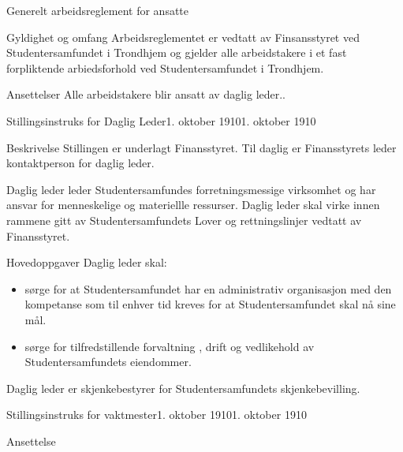 


\begin{lovkapittel}{Generelt arbeidsreglement for ansatte}


    \begin{lovparagraf}{Gyldighet og omfang}
        Arbeidsreglementet er vedtatt av Finsansstyret ved Studentersamfundet i Trondhjem
        og gjelder alle arbeidstakere i et fast forpliktende arbiedsforhold ved
        Studentersamfundet i Trondhjem. 
    \end{lovparagraf}

    \begin{lovparagraf}{Ansettelser}
        Alle arbeidstakere blir ansatt av daglig leder..
    \end{lovparagraf}


\end{lovkapittel}


\begin{instruks}{Stillingsinstruks for Daglig Leder}{1. oktober 1910}{1. oktober 1910}

    \begin{instruksledd}{Beskrivelse}
        Stillingen er underlagt Finansstyret. Til daglig er Finansstyrets leder
        kontaktperson for daglig leder.

        Daglig leder leder Studentersamfundes forretningsmessige virksomhet og har ansvar
        for menneskelige og materiellle ressurser. Daglig leder skal virke innen rammene
        gitt av Studentersamfundets Lover og rettningslinjer vedtatt av Finansstyret.
    \end{instruksledd}

    \begin{instruksledd}{Hovedoppgaver}
        Daglig leder skal:
        \begin{itemize}
            \item sørge for at Studentersamfundet har en administrativ organisasjon med
                den kompetanse som til enhver tid kreves for at Studentersamfundet skal nå
                sine mål.
            \item sørge for tilfredstillende forvaltning , drift og vedlikehold av
                Studentersamfundets eiendommer.
        \end{itemize}

        Daglig leder er skjenkebestyrer for Studentersamfundets skjenkebevilling.
    \end{instruksledd}

\end{instruks}


\begin{instruks}{Stillingsinstruks for vaktmester}{1. oktober 1910}{1. oktober 1910}
    \begin{instruksledd}{Ansettelse}
        
    \end{instruksledd}


\end{instruks}



